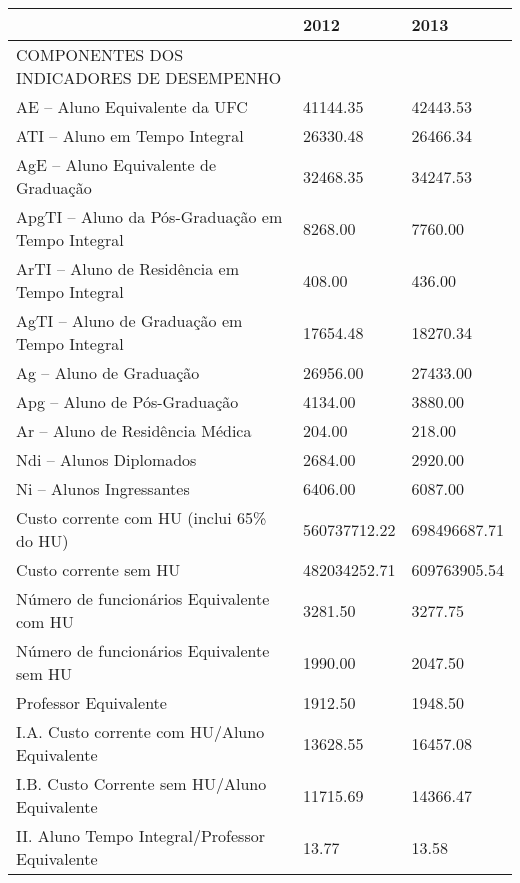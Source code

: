 \documentclass{article}
\begin{document}
\begin{tabular}{lll}
\toprule
{} &          2012 &          2013 \\
\midrule
COMPONENTES DOS INDICADORES DE DESEMPENHO                   &               &               \\
AE – Aluno Equivalente da UFC                              &  41144.35 &  42443.53 \\
ATI – Aluno em Tempo Integral                               &  26330.48 &  26466.34 \\
AgE – Aluno Equivalente de Graduação                        &  32468.35 &  34247.53 \\
ApgTI – Aluno da Pós-Graduação em Tempo Integral            &  8268.00 &  7760.00 \\
ArTI – Aluno de Residência em Tempo Integral                &  408.00 &  436.00 \\
AgTI – Aluno de Graduação em Tempo Integral                 &  17654.48 &  18270.34 \\
Ag – Aluno de Graduação                                     &  26956.00 &  27433.00 \\
Apg – Aluno de Pós-Graduação                                &  4134.00 &  3880.00 \\
Ar – Aluno de Residência Médica                             &  204.00 &  218.00 \\
Ndi – Alunos Diplomados                                     &  2684.00 &  2920.00 \\
Ni – Alunos Ingressantes                                    &  6406.00 &  6087.00 \\
Custo corrente com HU (inclui 65\% do HU)                   &  560737712.22 &  698496687.71 \\
Custo corrente sem HU                                       &  482034252.71 &  609763905.54 \\
Número de funcionários Equivalente com HU                   &  3281.50 &  3277.75 \\
Número de funcionários Equivalente sem HU                   &  1990.00 &  2047.50 \\
Professor Equivalente                                       &  1912.50 &  1948.50 \\
I.A. Custo corrente com HU/Aluno Equivalente                &  13628.55 &  16457.08 \\
I.B. Custo Corrente sem HU/Aluno Equivalente                &  11715.69 &  14366.47 \\
II. Aluno Tempo Integral/Professor Equivalente              &  13.77 &  13.58 \\

\end{tabular}
\end{document}
